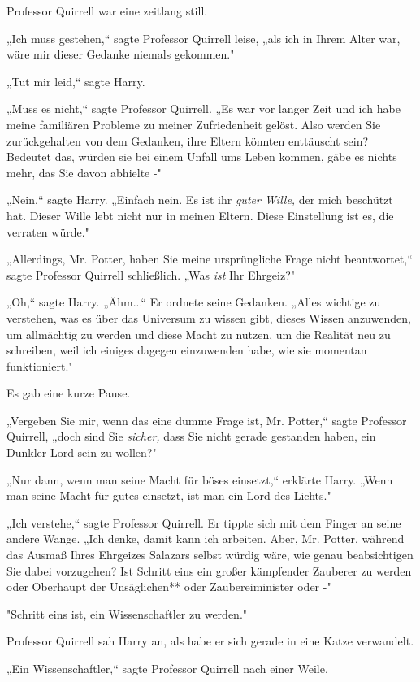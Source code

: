 {Professor Quirrell war eine zeitlang still.

„Ich muss gestehen,“ sagte Professor Quirrell leise, „als ich in Ihrem Alter war, wäre mir dieser Gedanke niemals gekommen."

„Tut mir leid,“ sagte Harry.

„Muss es nicht,“ sagte Professor Quirrell. „Es war vor langer Zeit und ich habe meine familiären Probleme zu meiner Zufriedenheit gelöst. Also werden Sie zurückgehalten von dem Gedanken, ihre Eltern könnten enttäuscht sein? Bedeutet das, würden sie bei einem Unfall ums Leben kommen, gäbe es nichts mehr, das Sie davon abhielte -"

„Nein,“ sagte Harry. „Einfach nein. Es ist ihr \emph{guter Wille,} der mich beschützt hat. Dieser Wille lebt nicht nur in meinen Eltern. Diese Einstellung ist es, die verraten würde."

„Allerdings, Mr. Potter, haben Sie meine ursprüngliche Frage nicht beantwortet,“ sagte Professor Quirrell schließlich. „Was \emph{ist} Ihr Ehrgeiz?"

„Oh,“ sagte Harry. „Ähm...“ Er ordnete seine Gedanken. „Alles wichtige zu verstehen, was es über das Universum zu wissen gibt, dieses Wissen anzuwenden, um allmächtig zu werden und diese Macht zu nutzen, um die Realität neu zu schreiben, weil ich einiges dagegen einzuwenden habe, wie sie momentan funktioniert."

Es gab eine kurze Pause.

„Vergeben Sie mir, wenn das eine dumme Frage ist, Mr. Potter,“ sagte Professor Quirrell, „doch sind Sie \emph{sicher,} dass Sie nicht gerade gestanden haben, ein Dunkler Lord sein zu wollen?"

„Nur dann, wenn man seine Macht für böses einsetzt,“ erklärte Harry. „Wenn man seine Macht für gutes einsetzt, ist man ein Lord des Lichts."

„Ich verstehe,“ sagte Professor Quirrell. Er tippte sich mit dem Finger an seine andere Wange. „Ich denke, damit kann ich arbeiten. Aber, Mr. Potter, während das Ausmaß Ihres Ehrgeizes Salazars selbst würdig wäre, wie genau beabsichtigen Sie dabei vorzugehen? Ist Schritt eins ein großer kämpfender Zauberer zu werden oder Oberhaupt der Unsäglichen** oder Zaubereiminister oder -"

"Schritt eins ist, ein Wissenschaftler zu werden."

Professor Quirrell sah Harry an, als habe er sich gerade in eine Katze verwandelt.

„Ein Wissenschaftler,“ sagte Professor Quirrell nach einer Weile.

}
